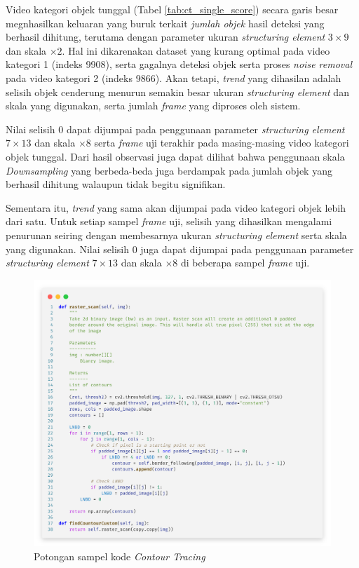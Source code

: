     	Video kategori objek tunggal (Tabel \ref{tab:ct_single_score}) secara garis besar megnhasilkan keluaran yang buruk terkait \emph{jumlah objek} hasil deteksi yang berhasil dihitung, terutama dengan parameter ukuran \textit{structuring element} $3\times9$ dan skala $\times2$. Hal ini dikarenakan dataset yang kurang optimal pada video kategori 1 (indeks 9908), serta gagalnya deteksi objek serta proses \textit{noise removal} pada video kategori 2 (indeks 9866). Akan tetapi, \textit{trend} yang dihasilan adalah selisih objek cenderung menurun semakin besar ukuran \textit{structuring element} dan skala yang digunakan, serta jumlah \textit{frame} yang diproses oleh sistem. 
    	
    	Nilai selisih $0$ dapat dijumpai pada penggunaan parameter \textit{structuring element} $7\times13$ dan skala $\times8$ serta \textit{frame} uji terakhir pada masing-masing video kategori objek tunggal. Dari hasil observasi juga dapat dilihat bahwa penggunaan skala \textit{Downsampling} yang berbeda-beda juga berdampak pada jumlah objek yang berhasil dihitung walaupun tidak begitu signifikan.
    	
    	Sementara itu, \textit{trend} yang sama akan dijumpai pada video kategori objek lebih dari satu. Untuk setiap sampel \textit{frame} uji, selisih yang dihasilkan mengalami penurunan seiring dengan membesarnya ukuran \textit{structuring element} serta skala yang digunakan. Nilai selisih $0$ juga dapat dijumpai pada penggunaan parameter \textit{structuring element} $7\times13$ dan skala $\times8$ di beberapa sampel \textit{frame} uji.
    
  		\vspace{-0.5cm}
	    \begin{figure}[H]
	    	\centering
	    	\singlespacing
	    	\captionsetup{justification=centering,margin=0.5cm}
	    	\includegraphics[width=15cm]{image/CodeSnap/contour_tracing_sample.png}
	    	\caption{Potongan sampel kode \textit{Contour Tracing}}
	    	\label{fig:code_gmm_morph}
	    \end{figure}
    
